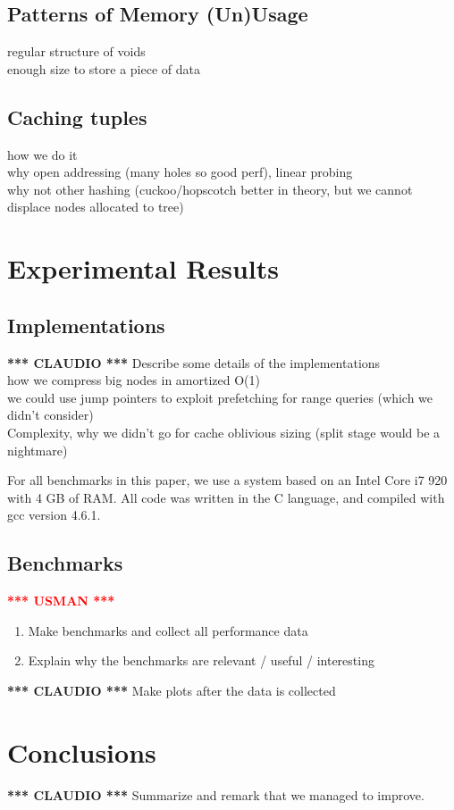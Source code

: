 \documentclass{article}
\newcommand{\usman}{\textcolor{Red}{\textbf{*** USMAN ***} }}
\newcommand{\claudio}{\textcolor{Cerulean}{\textbf{*** CLAUDIO ***} }}
\begin{document}
\subsection{Patterns of Memory (Un)Usage}
regular structure of voids \\
enough size to store a piece of data
\subsection{Caching tuples}
how we do it \\
why open addressing (many holes so good perf), linear probing \\
why not other hashing (cuckoo/hopscotch better in theory, but we cannot displace nodes allocated to tree) \\


\section{Experimental Results}

\subsection{Implementations}
\claudio
Describe some details of the implementations \\
how we compress big nodes in amortized O(1)\\
we could use jump pointers to exploit prefetching for range queries (which we didn't consider) \citep{Chen:2001} \\
Complexity, why we didn't go for cache oblivious sizing (split stage would be a nightmare)

For all benchmarks in this paper, we use a system based on an Intel Core i7 920 with 4 GB of RAM.
All code was written in the C language, and compiled with gcc version 4.6.1.

\subsection{Benchmarks}
\usman
\begin{enumerate}
	\item Make benchmarks and collect all performance data
	\item Explain why the benchmarks are relevant / useful / interesting
\end{enumerate}
\claudio
Make plots after the data is collected


\section{Conclusions}
\claudio
Summarize and remark that we managed to improve.

\small



\end{document}
